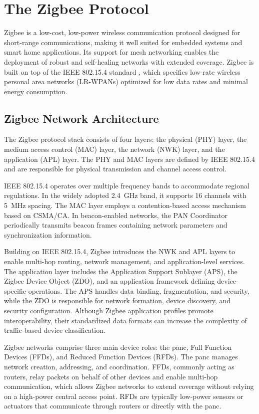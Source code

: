 \section{The Zigbee Protocol}
\label{background}
Zigbee is a low-cost, low-power wireless communication protocol designed for short-range communications, making it well suited for embedded systems and smart home applications. Its support for mesh networking enables the deployment of robust and self-healing networks with extended coverage. Zigbee is built on top of the IEEE 802.15.4 standard \cite{ieee_802_15_4}, which specifies low-rate wireless personal area networks (LR-WPANs) optimized for low data rates and minimal energy consumption.

\subsection{Zigbee Network Architecture}
The Zigbee protocol stack consists of four layers: the physical (PHY) layer, the medium access control (MAC) layer, the network (NWK) layer, and the application (APL) layer. The PHY and MAC layers are defined by IEEE 802.15.4 and are responsible for physical transmission and channel access control.

IEEE 802.15.4 operates over multiple frequency bands to accommodate regional regulations. In the widely adopted 2.4~GHz band, it supports 16 channels with 5~MHz spacing. The MAC layer employs a contention-based access mechanism based on CSMA/CA. In beacon-enabled networks, the PAN Coordinator periodically transmits beacon frames containing network parameters and synchronization information.

Building on IEEE 802.15.4, Zigbee introduces the NWK and APL layers to enable multi-hop routing, network management, and application-level services. The application layer includes the Application Support Sublayer (APS), the Zigbee Device Object (ZDO), and an application framework defining device-specific operations. The APS handles data binding, fragmentation, and security, while the ZDO is responsible for network formation, device discovery, and security configuration. Although Zigbee application profiles promote interoperability, their standardized data formats can increase the complexity of traffic-based device classification.

Zigbee networks comprise three main device roles: the \gls*{panc}, Full Function Devices (FFDs), and Reduced Function Devices (RFDs). The \gls*{panc} manages network creation, addressing, and coordination. FFDs, commonly acting as routers, relay packets on behalf of other devices and enable multi-hop communication, which allows Zigbee networks to extend coverage without relying on a high-power central access point. RFDs are typically low-power sensors or actuators that communicate through routers or directly with the \gls*{panc}.

